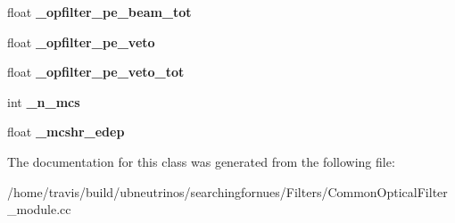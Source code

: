 \begin{DoxyCompactItemize}
\item 
float {\bfseries \+\_\+opfilter\+\_\+pe\+\_\+beam\+\_\+tot}\hypertarget{classCommonOpticalFilter_a89ac8cb77d6821567d434b662be81257}{}\label{classCommonOpticalFilter_a89ac8cb77d6821567d434b662be81257}

\item 
float {\bfseries \+\_\+opfilter\+\_\+pe\+\_\+veto}\hypertarget{classCommonOpticalFilter_ac4bcde210f0c9b8e672e60d6fbd99915}{}\label{classCommonOpticalFilter_ac4bcde210f0c9b8e672e60d6fbd99915}

\item 
float {\bfseries \+\_\+opfilter\+\_\+pe\+\_\+veto\+\_\+tot}\hypertarget{classCommonOpticalFilter_a18702fe52e59501c913cc7a1c5c64374}{}\label{classCommonOpticalFilter_a18702fe52e59501c913cc7a1c5c64374}

\item 
int {\bfseries \+\_\+n\+\_\+mcs}\hypertarget{classCommonOpticalFilter_a66994974ea5877849ba5ab3e8cd826de}{}\label{classCommonOpticalFilter_a66994974ea5877849ba5ab3e8cd826de}

\item 
float {\bfseries \+\_\+mcshr\+\_\+edep}\hypertarget{classCommonOpticalFilter_ab677aab9e2b4d5dafd40801c1f93a947}{}\label{classCommonOpticalFilter_ab677aab9e2b4d5dafd40801c1f93a947}

\end{DoxyCompactItemize}


The documentation for this class was generated from the following file\+:\begin{DoxyCompactItemize}
\item 
/home/travis/build/ubneutrinos/searchingfornues/\+Filters/Common\+Optical\+Filter\+\_\+module.\+cc\end{DoxyCompactItemize}
